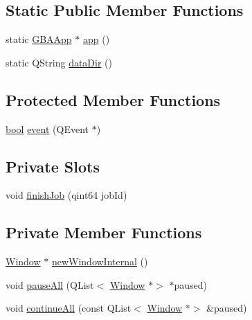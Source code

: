\subsection*{Static Public Member Functions}
\begin{DoxyCompactItemize}
\item 
static \mbox{\hyperlink{class_q_g_b_a_1_1_g_b_a_app}{G\+B\+A\+App}} $\ast$ \mbox{\hyperlink{class_q_g_b_a_1_1_g_b_a_app_a25af17e1ffd425419cafa67197ba4fe5}{app}} ()
\item 
static Q\+String \mbox{\hyperlink{class_q_g_b_a_1_1_g_b_a_app_ab8a3a502341e27c07bbff6dea7a6e14f}{data\+Dir}} ()
\end{DoxyCompactItemize}
\subsection*{Protected Member Functions}
\begin{DoxyCompactItemize}
\item 
\mbox{\hyperlink{libretro_8h_a4a26dcae73fb7e1528214a068aca317e}{bool}} \mbox{\hyperlink{class_q_g_b_a_1_1_g_b_a_app_a0c830b8ac4070d9c1ccd5be1055e693f}{event}} (Q\+Event $\ast$)
\end{DoxyCompactItemize}
\subsection*{Private Slots}
\begin{DoxyCompactItemize}
\item 
void \mbox{\hyperlink{class_q_g_b_a_1_1_g_b_a_app_a72d44afdcf810bcf2859e725ec3a2a54}{finish\+Job}} (qint64 job\+Id)
\end{DoxyCompactItemize}
\subsection*{Private Member Functions}
\begin{DoxyCompactItemize}
\item 
\mbox{\hyperlink{class_q_g_b_a_1_1_window}{Window}} $\ast$ \mbox{\hyperlink{class_q_g_b_a_1_1_g_b_a_app_a5c8986a8bd50f2dfc0ba2cf82212e57f}{new\+Window\+Internal}} ()
\item 
void \mbox{\hyperlink{class_q_g_b_a_1_1_g_b_a_app_afad24538ae16442e0b398fb6233e5c08}{pause\+All}} (Q\+List$<$ \mbox{\hyperlink{class_q_g_b_a_1_1_window}{Window}} $\ast$$>$ $\ast$paused)
\item 
void \mbox{\hyperlink{class_q_g_b_a_1_1_g_b_a_app_ae97c0144542f4d9d2b7301ae5097816f}{continue\+All}} (const Q\+List$<$ \mbox{\hyperlink{class_q_g_b_a_1_1_window}{Window}} $\ast$$>$ \&paused)
\end{DoxyCompactItemize}
